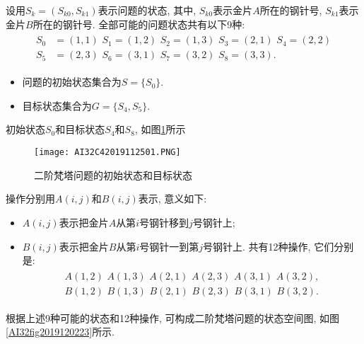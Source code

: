 \begin{result}
设用$S_k=(S_{k0}, S_{k1})$表示问题的状态, 其中, $S_{k0}$表示金片$A$所在的钢针号, $S_{k1}$表示金片$B$所在的钢针号.
全部可能的问题状态共有以下9种:
\begin{align}
\begin{array}{ll}
S_0&=(1, 1)\,\,   S_1=(1, 2)\,\,     S_2=(1, 3)\,\,    S_3=(2, 1)\,\,    S_4=(2, 2)\\
S_5&=(2, 3)\,\,   S_6=(3, 1) \,\,    S_7=(3, 2) \,\,   S_8=(3, 3).  
\end{array}
\end{align}

\begin{itemize}
\item 问题的初始状态集合为$S=\{S_0\}$.
\item 目标状态集合为$G=\{S_4, S_5\}$.
\end{itemize}
初始状态$S_0$和目标状态$S_4$和$S_8$, 如图\ref{AI32fig2019120222}所示
\begin{figure}[H]
\centering
\texttt{[image: AI32C42019112501.PNG]}
\caption{二阶梵塔问题的初始状态和目标状态}
\label{AI32fig2019120222}
\end{figure}
操作分别用$A(i, j)$和$B(i, j)$表示, 意义如下:
\begin{itemize}
\item  $A(i, j)$表示把金片$A$从第$i$号钢针移到$j$号钢针上;
\item  $B(i, j)$表示把金片$B$从第$i$号钢针一到第$j$号钢针上. 共有12种操作, 它们分别是:
\begin{align}
\begin{array}{ll}
      A(1, 2)\,\,   A(1, 3) \,\,    A(2, 1)\,\,     A(2, 3) \,\,    A(3, 1) \,\,    A(3, 2),\\
      B(1, 2)\,\,     B(1, 3) \,\,     B(2, 1)\,\,     B(2, 3)  \,\,   B(3, 1)  \,\,    B(3, 2).
\end{array}
\end{align}
\end{itemize}
根据上述9种可能的状态和12种操作, 可构成二阶梵塔问题的状态空间图, 如图\ref{AI32fig2019120223}所示.
\end{result}

